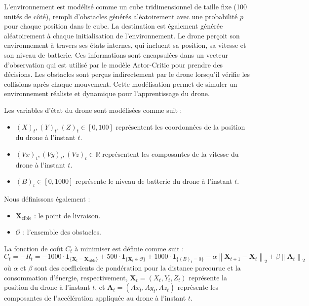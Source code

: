 \documentclass[a4paper, 12pt]{article}
\begin{document}
L'environnement est modélisé comme un cube tridimensionnel de taille fixe (100 unités de côté), rempli d'obstacles générés aléatoirement avec une probabilité $p$ pour chaque position dans le cube. La destination est également générée aléatoirement à chaque initialisation de l'environnement. Le drone perçoit son environnement à travers ses états internes, qui incluent sa position, sa vitesse et son niveau de batterie. Ces informations sont encapsulées dans un vecteur d'observation qui est utilisé par le modèle Actor-Critic pour prendre des décisions. Les obstacles sont perçus indirectement par le drone lorsqu'il vérifie les collisions après chaque mouvement. Cette modélisation permet de simuler un environnement réaliste et dynamique pour l'apprentissage du drone.

Les variables d'état du drone sont modélisées comme suit :
\begin{itemize}
    \item $(X)_t, (Y)_t, (Z)_t \in [0, 100]$ représentent les coordonnées de la position du drone à l'instant $t$.
    \item $(Vx)_t, (Vy)_t, (Vz)_t \in \mathbb{R}$ représentent les composantes de la vitesse du drone à l'instant $t$.
    \item $(B)_t \in [0, 1000]$ représente le niveau de batterie du drone à l'instant $t$.
\end{itemize}

Nous définissons également :
\begin{itemize}
    \item $\mathbf{X}_{\text{cible}}$ : le point de livraison.
    \item $\mathcal{O}$ : l'ensemble des obstacles.
\end{itemize}

La fonction de coût $C_t$ à minimiser est définie comme suit :
\[
C_t = -R_t = 
-1000 \cdot \mathbf{1}_{\{\mathbf{X}_t = \mathbf{X}_{\text{cible}}\}} + 500 \cdot \mathbf{1}_{\{\mathbf{X}_t \in \mathcal{O}\}} + 1000 \cdot \mathbf{1}_{\{(B)_t = 0\}} - \alpha \left\| \mathbf{X}_{t+1} - \mathbf{X}_t \right\|_2 + \beta \left\| \mathbf{A}_t \right\|_2
\]
où $\alpha$ et $\beta$ sont des coefficients de pondération pour la distance parcourue et la consommation d'énergie, respectivement, $\mathbf{X}_t = (X_t, Y_t, Z_t)$ représente la position du drone à l'instant $t$, et $\mathbf{A}_t = (Ax_t, Ay_t, Az_t)$ représente les composantes de l'accélération appliquée au drone à l'instant $t$.
\end{document}
